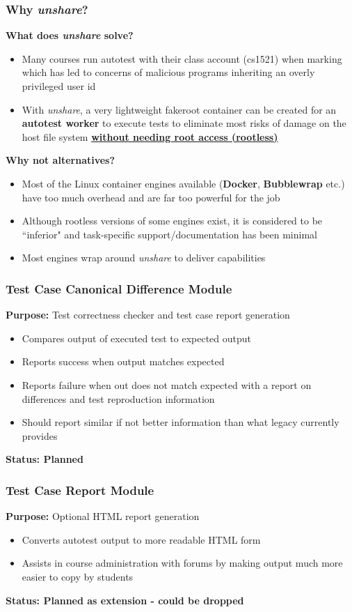 \documentclass[xcolor]{beamer}
\begin{document}
\begin{frame}
	\frametitle{Why \textit{unshare}?}
	\textbf{What does \textit{unshare} solve?}
	\pause
	\begin{itemize}
		\item Many courses run autotest with their class account (cs1521) when marking which has led to concerns of malicious programs inheriting an overly privileged user id
		\pause
		\item With \textit{unshare}, a very lightweight fakeroot container can be created for an \textbf{autotest worker} to execute tests to eliminate most risks of damage on the host file system \textbf{\underline{without needing root access (rootless)}}
	\end{itemize}
	\pause
	\textbf{Why not alternatives?}\\
	\pause
	\begin{itemize}
		\item Most of the Linux container engines available (\textbf{Docker}, \textbf{Bubblewrap} etc.) have too much overhead and are far too powerful for the job
		\pause
		\item Although rootless versions of some engines exist, it is considered to be ``inferior" and task-specific support/documentation has been minimal
		\pause
		\item Most engines wrap around \textit{unshare} to deliver capabilities
	\end{itemize}
\end{frame}

\begin{frame}
	\frametitle{Test Case Canonical Difference Module}
	\textbf{Purpose:} Test correctness checker and test case report generation\\
	\begin{itemize}
		\item Compares output of executed test to expected output
		\pause
		\item Reports success when output matches expected
		\pause
		\item Reports failure when out does not match expected with a report on differences and test reproduction information
		\pause
		\item Should report similar if not better information than what legacy currently provides
		\pause
	\end{itemize}
	\textbf{Status: Planned}
\end{frame}

\begin{frame}
	\frametitle{Test Case Report Module}
	\textbf{Purpose:} Optional HTML report generation\\
	\begin{itemize}
		\item Converts autotest output to more readable HTML form
		\pause
		\item Assists in course administration with forums by making output much more easier to copy by students
		\pause
	\end{itemize}
	\textbf{Status: Planned as extension - could be dropped}
\end{frame}
\end{document}
